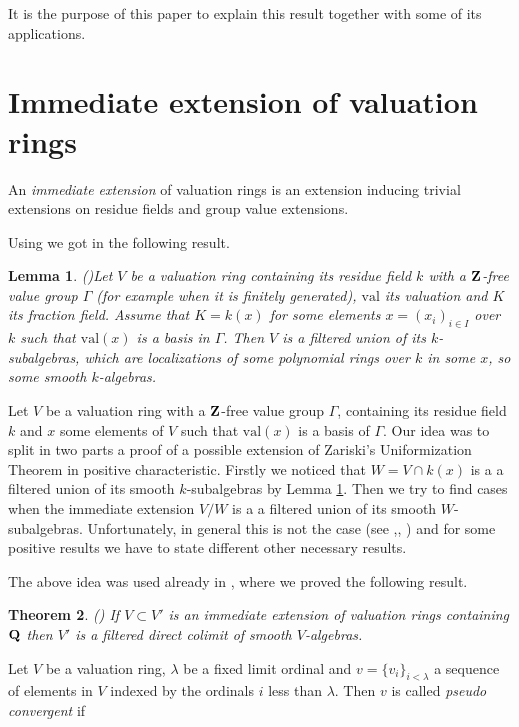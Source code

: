 \documentclass[12pt]{amsart}
\newtheorem{Theorem}{Theorem}[]
\newtheorem{Lemma}[Theorem]{Lemma}
\theoremstyle{definition}
\theoremstyle{subsection-tweak}
\theoremstyle{theorem}
\theoremstyle{definition}
\newcommand{\val}{\mathrm{val}}		%
\begin{document}
It is the purpose of this paper to explain this result together with some of its applications.

\section{Immediate extension of valuation rings}


An {\it{immediate extension}} of valuation rings is an extension inducing trivial extensions on residue fields and group value extensions.

Using \cite[Theorem 1,VI,(10.3)]{Bou} we got in \cite[Lemma 26 (1)]{P} the following result.
   \begin{Lemma}(\cite{P})\label{l} Let $V$ be a  valuation ring containing its residue field $k$    with a $\bf Z$-free value group $\Gamma$ (for example when it is finitely generated), $\val$ its valuation and $K$ its fraction field. Assume that  $K=k(x)$ for some   elements $x=(x_i)_{i\in I}$ over $k$ such that $\val(x)$ is a basis in $\Gamma$. 
 Then $V$ is a filtered  union of its  $k$-subalgebras, which are localizations of some polynomial rings over $k$ in some $x$, so some smooth $k$-algebras.
\end{Lemma}

Let $V$ be a valuation ring  with a $\bf Z$-free  value group  $\Gamma$,  containing its residue field $k$  and $x$ some elements of $V$ such that $\val(x)$ is a basis of $\Gamma$.
Our idea was to split in two parts  a proof of a possible extension of Zariski's Uniformization Theorem in positive characteristic. Firstly we noticed that $W=V\cap k(x)$ is a  a filtered  union of its smooth $k$-subalgebras by Lemma \ref{l}. Then we try to find cases when the immediate extension $V/W$ is  a  a filtered  union of its smooth $W$-subalgebras. Unfortunately, in general  this is not the case (see \cite[Example 3.1.3]{Po1},\cite{O},  \cite[Example 3.6]{P4}) and for some positive results we have to state different other necessary results.

The above idea was used already in \cite{P}, where we proved the following result.

\begin{Theorem} (\cite[Theorem 2]{P})
 If $V\subset V'$ is an immediate extension of valuation rings   containing $\bf Q$
then $V'$ is a filtered direct colimit of smooth $V$-algebras. 
\end{Theorem}


Let $V$ be a valuation ring, $\lambda$ be a fixed limit ordinal  and $v=\{v_i \}_{i < \lambda}$ a sequence of elements in $V$ indexed by the ordinals $i$ less than  $\lambda$. Then $v$ is called \emph{pseudo convergent} if 
\end{document}
